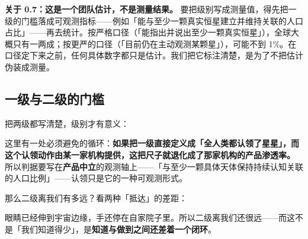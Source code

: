 \documentclass[11pt,fontset=none]{ctexart}
\begin{document}
\textbf{关于 0.7：这是一个团队估计，不是测量结果。} 要把级别写成测量值，得先把一级的门槛落成可观测指标——例如「能与至少一颗真实恒星建立并维持关联的人口占比」——再去统计。按严格口径（「能指出并说出至少一颗真实恒星」），全球大概只有一两成；按更严的口径（「目前仍在主动观测某颗星」），可能不到 1\%。在口径定下来之前，任何具体数字都只是估计。我们把它标注清楚，是为了不把估计伪装成测量。

\subsection{一级与二级的门槛}

把两级都写清楚，级别才有意义：


这里有一处必须避免的循环：\textbf{如果把一级直接定义成「全人类都认领了星星」，而这个认领动作由某一家机构提供，这把尺子就退化成了那家机构的产品渗透率。} 所以判据要写在\textbf{产品中立}的观测轴上——「与至少一颗具体天体保持持续认知关联的人口比例」——认领只是它的一种可观测形式。

那么二级离我们有多远？看两种「抵达」的差距：


眼睛已经伸到宇宙边缘，手还停在自家院子里。所以二级离我们还很远——而这不是「我们知道得少」，是\textbf{知道与做到之间还差着一个闭环}。
\end{document}
